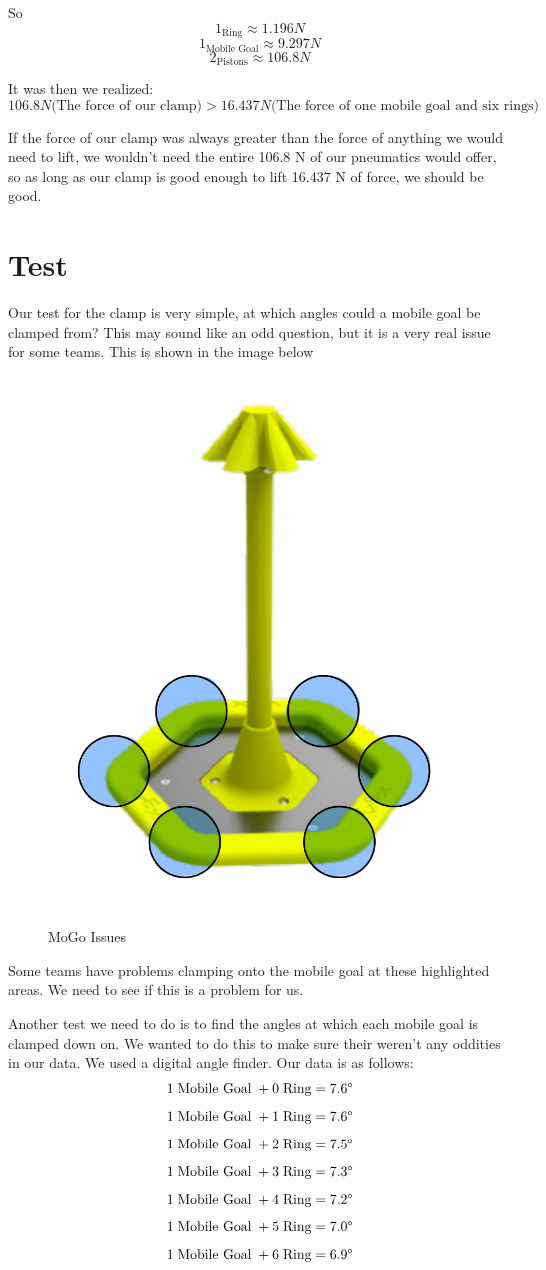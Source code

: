 So \[1_\text{Ring} \approx 1.196 N\] \[1_\text{Mobile Goal} \approx 9.297 N\] \[2_\text{Pistons} \approx 106.8 N\]

It was then we realized: \[106.8N \text{(The force of our clamp)} > 16.437N\text{(The force of one mobile goal and six rings)}\]

If the force of our clamp was always greater than the force of anything we would need to lift, we wouldn't need the entire 106.8 N of our pneumatics would offer, so as long as our clamp is good enough to lift 16.437 N of force, we should be good.
\section*{Test}
Our test for the clamp is very simple, at which angles could a mobile goal be clamped from? This may sound like an odd question, but it is a very real issue for some teams. This is shown in the image below \\
\begin{figure}[h!]
    \centering
    \includegraphics[width=0.5\linewidth]{images/MoGo w Highlights.jpeg}
    \caption{MoGo Issues}
    \label{fig:mogohighlights}
\end{figure}
Some teams have problems clamping onto the mobile goal at these highlighted areas. We need to see if this is a problem for us. 

Another test we need to do is to find the angles at which each mobile goal is clamped down on. We wanted to do this to make sure their weren't any oddities in our data. We used a digital angle finder.
Our data is as follows:
\[
1 \; \text{Mobile Goal} \; + 0 \; \text{Ring} = 7.6 \degree
\]
\[
1 \; \text{Mobile Goal} \; + 1 \; \text{Ring} = 7.6 \degree
\]
\[
1 \; \text{Mobile Goal} \; + 2 \; \text{Ring} = 7.5 \degree
\]
\[
1 \; \text{Mobile Goal} \; + 3 \; \text{Ring} = 7.3 \degree
\]
\[
1 \; \text{Mobile Goal} \; + 4 \; \text{Ring} = 7.2 \degree
\]
\[
1 \; \text{Mobile Goal} \; + 5 \; \text{Ring} = 7.0 \degree
\]
\[
1 \; \text{Mobile Goal} \; + 6 \; \text{Ring} = 6.9 \degree
\]

